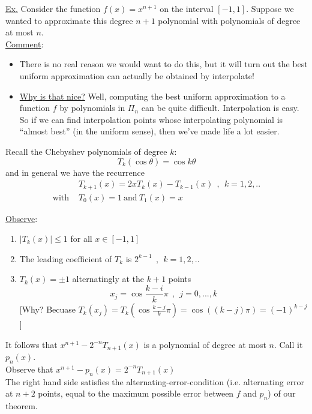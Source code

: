{\underline{Ex.} Consider the function $f(x) = x^{n+1}$ on the interval $[-1,1]$. Suppose we wanted to approximate this degree $n+1$ polynomial with polynomials of degree at most $n$. \\

\underline{Comment}: 
\begin{itemize}
    \item There is no real reason we would want to do this, but it will turn out the best uniform approximation can actually be obtained by interpolate!
    \item \underline{Why is that nice?} Well, computing the best uniform approximation to a function $f$ by polynomials in $\Pi_n$ can be quite difficult. Interpolation is easy. So if we can find interpolation points whose interpolating polynomial is ``almost best'' (in the uniform sense), then we've made life a lot easier.
\end{itemize}

Recall the Chebyshev polynomials of degree $k$:
\begin{equation*}
    T_k(\cos{\theta}) = \cos{k\theta}
\end{equation*}
and in general we have the recurrence
\begin{align*}
    &T_{k+1}(x) = 2x T_k(x) - T_{k-1}(x)~~,~~k = 1,2, .. \\
    \text{with }& T_0(x) = 1~\text{and}~T_1(x) = x
\end{align*}

\underline{Observe}:
\begin{enumerate}
    \item $|T_k(x)| \leq 1$ for all $x \in [-1,1]$
    \item The leading coefficient of $T_k$ is $2^{k-1}~~,~~k = 1,2, ..$
    \item $T_k(x) = \pm 1$ alternatingly at the $k+1$ points \\
    $$x_j = \cos{\frac{k - i}{k}} \pi~~,~~j = 0, ... , k$$
    [Why? Becuase $T_k(x_j) = T_k(\cos{\frac{k - j}{k}} \pi) = \cos{((k-j)\pi)} = (-1)^{k-j}$]
\end{enumerate}

It follows that $x^{n+1} - 2^{-n} T_{n+1}(x)$ is a polynomial of degree at most $n$. Call it $p_n(x)$. \\

Observe that $x^{n+1} - p_n(x) = 2^{-n} T_{n+1}(x)$ \\

The right hand side satisfies the alternating-error-condition (i.e. alternating error at $n+2$ points, equal to the maximum possible error between $f$ and $p_n$) of our theorem. \\

}
